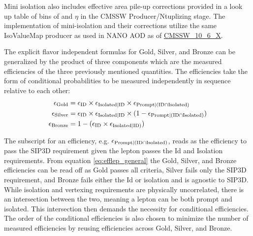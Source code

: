 Mini isolation also includes effective area pile-up corrections provided in a look up table of bins of \pt and $\eta$ in the CMSSW Producer/Ntuplizing stage. The implementation of mini-isolation and their corrections utilize the same IsoValueMap producer as used in NANO AOD as of \url{CMSSW_10_6_X}.


The explicit flavor independent formulas for Gold, Silver, and Bronze can be generalized by the product of three components which are the measured efficiencies of the three previously mentioned quantities. The efficiencies take the form of conditional probabilities to be measured independently in sequence relative to each other:
\begin{equation}\label{eq:efflep_general}
\begin{split}
\epsilon_{\text{Gold}}& = \epsilon_{\text{ID}}\times \epsilon_{\text{Isolated}|\text{ID}} \times \epsilon_{\text{Prompt}|(\text{ID} \cap \text{Isolated})} \\
\epsilon_{\text{Silver}}& = \epsilon_{\text{ID}} \times \epsilon_{\text{Isolated}|\text{ID}} \times (1-\epsilon_{\text{Prompt}|(\text{ID} \cap \text{Isolated})}) \\
\epsilon_{\text{Bronze}}& = 1-(\epsilon_{\text{ID}} \times \epsilon_{\text{Isolated}|\text{ID})} )
\end{split}
\end{equation}

The subscript for an efficiency, e.g. $\epsilon_{\text{Prompt}|(\text{ID} \cap \text{Isolated})}$, reads as the efficiency to pass the SIP3D requirement given the lepton passes the Id and Isolation requirements. From equation \ref{eq:efflep_general} the Gold, Silver, and Bronze efficiencies can be read off as Gold passes all criteria, Silver fails only the SIP3D requirement, and Bronze fails either the Id or isolation and is agnostic to SIP3D. While isolation and vertexing requirements are physically uncorrelated, there is an intersection between the two, meaning a lepton can be both prompt and isolated. This intersection then demands the necessity for conditional efficiencies.  The order of the conditional efficiencies is also chosen to minimize the number of measured efficiencies by reusing efficiencies across Gold, Silver, and Bronze.  





